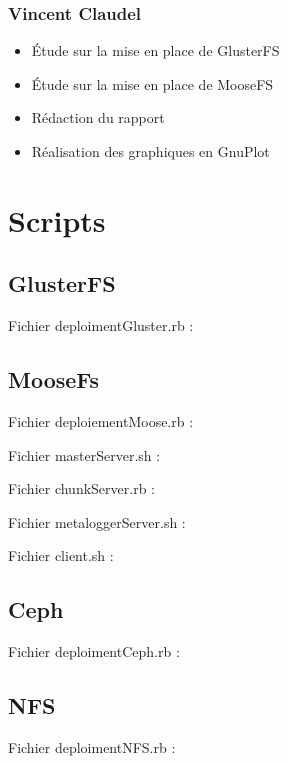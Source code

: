 \documentclass[12pt]{report}
\begin{document}
				\subsection{Vincent Claudel}
					\begin{itemize}
						\item Étude sur la mise en place de GlusterFS
						\item Étude sur la mise en place de MooseFS
						\item Rédaction du rapport
						\item Réalisation des graphiques en GnuPlot
					\end{itemize}	
		\chapter{Scripts}
			\section{GlusterFS}
				Fichier deploimentGluster.rb :
				
			\section{MooseFs}
                                Fichier deploiementMoose.rb :
                                
                                Fichier masterServer.sh :
                                
\newpage
                                Fichier chunkServer.rb :
                                
                                Fichier metaloggerServer.sh :
                                
                                Fichier client.sh :
                                
			\section{Ceph}
				Fichier deploimentCeph.rb :
				
			\section{NFS}
				Fichier deploimentNFS.rb :
				
\end{document}

